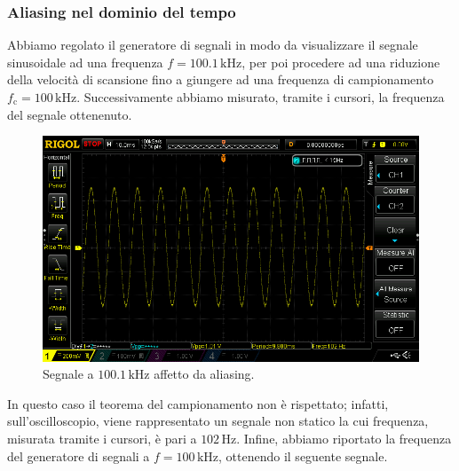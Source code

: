 \documentclass[a4paper]{article}
\begin{document}
			\subsubsection{Aliasing nel dominio del tempo}
				Abbiamo regolato il generatore di segnali in modo da visualizzare il segnale sinusoidale ad una frequenza $ f = 100.1 \, \mathrm{kHz} $, per poi procedere ad una riduzione della velocità di scansione fino a giungere ad una frequenza di campionamento $ f_{\mathrm{c}} = 100 \, \mathrm{kHz} $. Successivamente abbiamo misurato, tramite i cursori, la frequenza del segnale ottenenuto.
				\begin{figure}[h!]
					\centering
					\includegraphics[scale=0.4]{aliasing100_1kHz}
					\caption{Segnale a $ 100.1 \, \mathrm{kHz} $ affetto da aliasing.}
					\label{fig:aliasing100_1kHz}
				\end{figure}
				\newpage
				In questo caso il teorema del campionamento non è rispettato; infatti, sull’oscilloscopio, viene rappresentato un segnale non statico la cui frequenza, misurata tramite i cursori, è pari a $ 102 \, \mathrm{Hz} $.
				\newline
				Infine, abbiamo riportato la frequenza del generatore di segnali a $ f = 100 \, \mathrm{kHz} $, ottenendo il seguente segnale.
\end{document}
